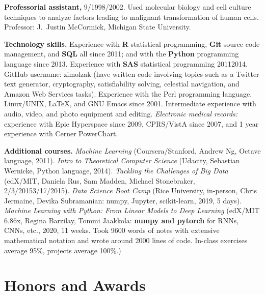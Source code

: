 \documentclass[10pt]{article}
\begin{document}
\textbf{Professorial assistant,} 9/1998/2002. Used molecular
biology and cell culture techniques to analyze factors leading to
malignant transformation of human cells. Professor: J.\ Justin
McCormick, Michigan State University.

\textbf{Technology skills.} Experience with \textbf{R} statistical
programming, \textbf{Git} source code management, and \textbf{SQL} all
since 2011; and with the \textbf{Python} programming language since
2013. Experience with \textbf{SAS} statistical programming
2011\ndash{}2014. GitHub username: zimolzak (have written code
involving topics such as a Twitter text generator, cryptography,
satisfiability solving, celestial navigation, and Amazon Web Services
tasks). Experience with the Perl programming language, Linux/UNIX,
\LaTeX, and GNU Emacs since 2001. Intermediate experience with audio,
video, and photo equipment and editing. \emph{Electronic medical
records:} experience with Epic Hyperspace since 2009, CPRS/VistA since
2007, and 1 year experience with Cerner PowerChart.

\textbf{Additional courses.} \emph{Machine Learning}
(Coursera/Stanford, Andrew Ng, Octave language, 2011). \emph{Intro to
Theoretical Computer Science} (Udacity, Sebastian Wernicke, Python
language, 2014). \emph{Tackling the Challenges of Big Data} (edX/MIT,
Daniela Rus, Sam Madden, Michael Stonebraker,
2/3/2015\ndash{}3/17/2015). \emph{Data Science Boot Camp} (Rice
University, in-person, Chris Jermaine, Devika Subramanian: numpy,
Jupyter, scikit-learn, 2019, 5 days). \emph{Machine Learning with
Python: From Linear Models to Deep Learning} (edX/MIT 6.86x, Regina
Barzilay, Tommi Jaakkola: \textbf{numpy and pytorch} for RNNs, CNNs,
etc., 2020, 11 weeks. Took 9600 words of notes with extensive
mathematical notation and wrote around 2000 lines of code. In-class
exercises average 95\%, projects average 100\%.)



\section{Honors and Awards}  %
\end{document}
